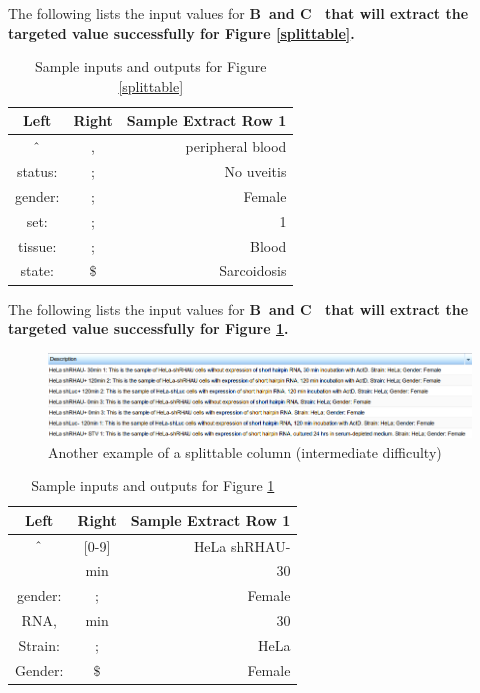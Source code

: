 \documentclass[a4paper]{article}
\begin{document}
The following lists the input values for \bf{B}\rm ~and \bf{C}\rm~ that will extract the targeted value successfully for Figure \ref{splittable}.
\begin{table}
\begin{center}
\begin{tabular}{| c c r |}
\hline
Left & Right & Sample Extract Row 1\\
\hline
  $\mathbin{\char`\^}$ & , & peripheral blood \\
\hline
status: & ; & No uveitis \\
\hline
gender: & ; & Female \\
\hline
set: & ; & 1 \\
\hline
tissue: & ; & Blood \\
\hline
state: & $\$$ & Sarcoidosis\\
\hline
\end{tabular}
\end{center}
\caption{Sample inputs and outputs for Figure \ref{splittable}}
\end{table}

\newpage
The following lists the input values for \bf{B}\rm ~and \bf{C}\rm~ that will extract the targeted value successfully for Figure \ref{splittable2}.

\begin{figure}[h]
\caption{Another example of a splittable column (intermediate difficulty)}
\centering
\label{splittable2}
\includegraphics[width=17cm]{images/moreextract}
\end{figure}


\begin{table}[h]
\begin{center}
\begin{tabular}{| c c r |}
\hline
Left & Right & Sample Extract Row 1\\
\hline
  $\mathbin{\char`\^}$ & [0-9] & HeLa shRHAU-\\
\hline
[+-] & min & 30 \\
\hline
gender: & ; & Female \\
\hline
RNA, & min & 30 \\
\hline
Strain: & ; & HeLa \\
\hline
Gender: & $\$$ & Female\\
\hline
\end{tabular}
\end{center}
\caption{Sample inputs and outputs for Figure \ref{splittable2}}
\end{table}
\end{document}
